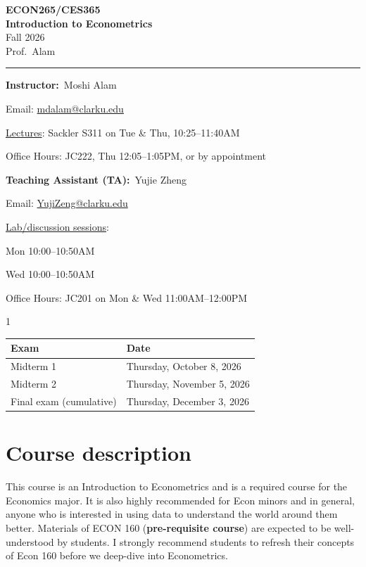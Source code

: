 \documentclass[11pt]{article}
\makeatletter
\newcommand{\CourseNumber}{ECON265/CES365}
\newcommand{\CourseTitle}{Introduction to Econometrics}
\newcommand{\Semester}{Fall 2026}
\newcommand{\InstructorName}{Moshi Alam}
\newcommand{\InstructorEmail}{mdalam@clarku.edu}
\newcommand{\LectureRoom}{Sackler S311}
\newcommand{\LectureTimes}{Tue \& Thu, 10:25--11:40AM}
\newcommand{\OfficeRoom}{JC222}
\newcommand{\OfficeHours}{Thu 12:05--1:05PM, or by appointment}
\newcommand{\TAName}{Yujie Zheng}
\newcommand{\TAEmail}{YujiZeng@clarku.edu}
\newcommand{\TASessions}{%
  \SectionLine{Mon 10:00--10:50AM}{Carlson CH128}%
  \SectionLine{Wed 10:00--10:50AM}{Carlson CH120}%
}
\newcommand{\TAOfficeHours}{Mon \& Wed 11:00AM--12:00PM}
\newcommand{\TAOfficeRoom}{JC201}
\newcommand{\ShowExamDates}{1}
\newcommand{\MidtermOneDate}{Thursday, October 8, 2026}
\newcommand{\MidtermTwoDate}{Thursday, November 5, 2026}
\newcommand{\FinalDate}{Thursday, December 3, 2026}
\newcommand{\info}[2]{\textbf{#1:}~#2\par}
\newcommand{\SectionLine}[2]{\par\hspace*{1.5em}#1\quad[#2]}
\newcommand{\ul}[1]{\underline{#1}}
\makeatother
\begin{document}
\begin{center}
  {\LARGE\bfseries\color{accent}\CourseNumber}\\[0.35em]
  {\LARGE\bfseries \CourseTitle}\\[0.6em]
  {\large \Semester}\\[0.2em]
  {\large Prof.\ Alam}
\end{center}
\vspace{0.6em}
\hrule
\vspace{0.9em}

\info{Instructor}{\InstructorName}
Email: \href{mailto:\InstructorEmail}{\InstructorEmail}\par
\ul{Lectures}: \LectureRoom{} on \LectureTimes\par
Office Hours: \OfficeRoom, \OfficeHours\par

\vspace{0.6em}
\info{Teaching Assistant (TA)}{\TAName}
Email: \href{mailto:\TAEmail}{\TAEmail}\par
\ul{Lab/discussion sessions}:\TASessions\par
Office Hours: \TAOfficeRoom{} on \TAOfficeHours\par

\if\ShowExamDates1
\vspace{0.9em}
\begin{center}
\begin{tabularx}{0.85\textwidth}{@{}lX@{}}
\toprule
\textbf{Exam} & \textbf{Date} \\
\midrule
Midterm 1 & \MidtermOneDate \\
Midterm 2 & \MidtermTwoDate \\
Final exam (cumulative) & \FinalDate \\
\bottomrule
\end{tabularx}
\end{center}
\fi

\section{Course description}

This course is an Introduction to Econometrics and is a required course for the
Economics major. It is also highly recommended for Econ minors and in general,
anyone who is interested in using data to understand the world around them
better. Materials of ECON 160 (\textbf{pre-requisite course}) are expected to be
well-understood by students. I strongly recommend students to refresh their
concepts of Econ 160 before we deep-dive into Econometrics.
\end{document}
